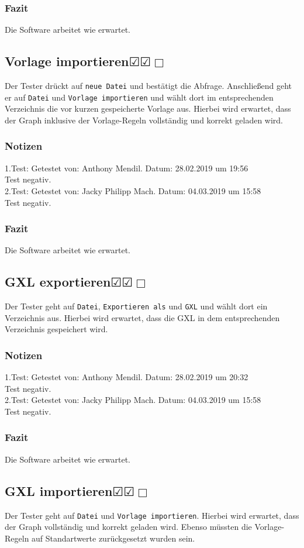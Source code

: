 \documentclass[enabledeprecatedfontcommands]{scrartcl}
\newcommand{\subsectiont}[2]{\subsection[#1]{#1{\normalsize\normalfont #2}}}
\newcommand{\leer}{$\Box$}
\newcommand{\ok}{$\CheckedBox$}
\begin{document}
\subsubsection{Fazit}
Die Software arbeitet wie erwartet.

\subsectiont{Vorlage importieren}{\dotfill\ok\ok\leer}
Der Tester drückt auf \texttt{neue Datei} und bestätigt die Abfrage. Anschließend geht er auf \texttt{Datei} und \texttt{Vorlage importieren} und wählt dort im entsprechenden Verzeichnis die vor kurzen gespeicherte Vorlage aus. Hierbei wird erwartet, dass der Graph inklusive der Vorlage-Regeln vollständig und korrekt geladen wird. 
\subsubsection{Notizen}
1.Test: Getestet von: Anthony Mendil. Datum: 28.02.2019 um 19:56 \\
Test negativ.\\
2.Test: Getestet von: Jacky Philipp Mach. Datum: 04.03.2019 um 15:58 \\
Test negativ.
\subsubsection{Fazit}
Die Software arbeitet wie erwartet.

\subsectiont{GXL exportieren}{\dotfill\ok\ok\leer}
Der Tester geht auf \texttt{Datei}, \texttt{Exportieren als} und \texttt{GXL} und wählt dort ein Verzeichnis aus. Hierbei wird erwartet, dass die GXL in dem entsprechenden Verzeichnis gespeichert wird.
\subsubsection{Notizen}
1.Test: Getestet von: Anthony Mendil. Datum: 28.02.2019 um 20:32 \\
Test negativ.\\
2.Test: Getestet von: Jacky Philipp Mach. Datum: 04.03.2019 um 15:58 \\
Test negativ.
\subsubsection{Fazit}
Die Software arbeitet wie erwartet.

\subsectiont{GXL importieren}{\dotfill\ok\ok\leer}
Der Tester geht auf \texttt{Datei} und \texttt{Vorlage importieren}. Hierbei wird erwartet, dass der Graph vollständig und korrekt geladen wird. Ebenso müssten die Vorlage-Regeln auf Standartwerte zurückgesetzt wurden sein. 
\end{document}
